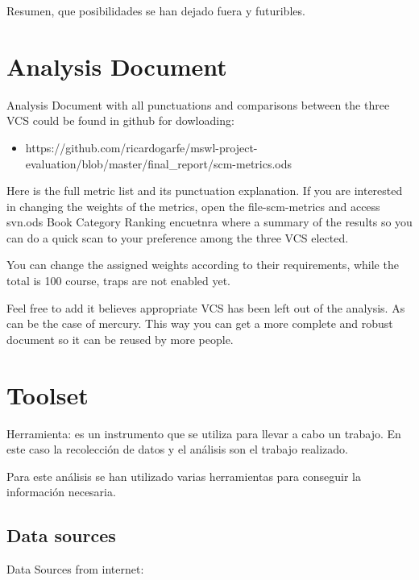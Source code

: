 \documentclass[11pt]{scrartcl}
\begin{document}
Resumen, que posibilidades se han dejado fuera y futuribles.

\section{Analysis Document}

Analysis Document with all punctuations and comparisons between the three VCS could be found in github for dowloading:
\begin{itemize}
    \item https://github.com/ricardogarfe/mswl-project-evaluation/blob/master/final\_report/scm-metrics.ods
\end{itemize}

Here is the full metric list and its punctuation explanation. If you are interested in changing the weights of the metrics, open the file-scm-metrics and access svn.ods Book Category Ranking encuetnra where a summary of the results so you can do a quick scan to your preference among the three VCS elected.

\par You can change the assigned weights according to their requirements, while the total is 100 course, traps are not enabled yet.

\par Feel free to add it believes appropriate VCS has been left out of the analysis. As can be the case of mercury. This way you can get a more complete and robust document so it can be reused by more people.

\section{Toolset}

\par Herramienta: es un instrumento que se utiliza para llevar a cabo un trabajo. En este caso la recolecci\'on de datos y el an\'alisis son el trabajo realizado.

\par Para este an\'alisis se han utilizado varias herramientas para conseguir la informaci\'on necesaria.

\subsection{Data sources}

Data Sources from internet:
\end{document}
